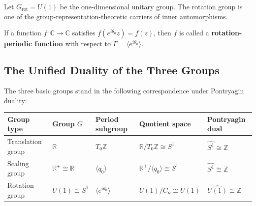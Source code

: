 \begin{definition}\label{def:rotation_group_basic}
Let $G_{\text{rot}} = U(1)$ be the one-dimensional unitary group. The rotation group is one of the group-representation-theoretic carriers of inner automorphisms.
\end{definition}

\begin{definition}\label{def:rotation_function_basic}
If a function $f: \mathbb{C} \to \mathbb{C}$ satisfies $f(e^{i\theta_0} z) = f(z)$, then $f$ is called a \textbf{rotation-periodic function} with respect to $\Gamma = \langle e^{i\theta_0} \rangle$.
\end{definition}

\subsection{The Unified Duality of the Three Groups}

\begin{theorem}\label{thm:three_groups_duality}
The three basic groups stand in the following correspondence under Pontryagin duality:
\begin{center}
\begin{tabular}{>{\centering\arraybackslash}p{2.2cm}>{\centering\arraybackslash}p{2.2cm}>{\centering\arraybackslash}p{2.5cm}>{\centering\arraybackslash}p{2.5cm}>{\centering\arraybackslash}p{3cm}}
\toprule
Group type & Group $G$ & Period subgroup & Quotient space & Pontryagin dual \\
\midrule
Trans\-lation group & $\mathbb{R}$ & $T_0\mathbb{Z}$ & $\mathbb{R}/T_0\mathbb{Z} \cong S^1$ & $\widehat{S^1} \cong \mathbb{Z}$ \\
Scaling group & $\mathbb{R}^+ \cong \mathbb{R}$ & $\langle q_0 \rangle$ & $\mathbb{R}^+/\langle q_0 \rangle \cong S^1$ & $\widehat{S^1} \cong \mathbb{Z}$ \\
Rotation group & $U(1) \cong S^1$ & $\langle e^{i\theta_0} \rangle$ & $U(1)/C_n \cong U(1)$ & $\widehat{U(1)} \cong \mathbb{Z}$ \\
\bottomrule
\end{tabular}
\end{center}
\end{theorem}

